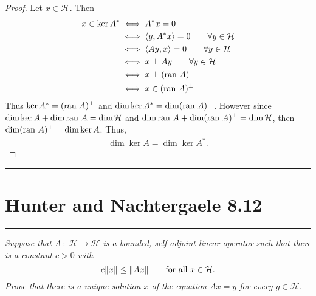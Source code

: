\documentclass{article} %
\theoremstyle{plain}
\newcommand{\VEC}[2]{\left\langle #1, #2 \right\rangle}
\newcommand{\ran}{\text{\rm ran }}
\newcommand{\problem}[1]{
\vspace{.375cm}
\begin{minipage}{\textwidth}
    \begin{center}
        \noindent\rule{5cm}{1pt}
    \end{center}
    \section{\bf #1}
    \begin{center}
        \noindent\rule{5cm}{1pt}
    \end{center}
    \vspace{0.25cm}
\end{minipage}
}
\numberwithin{equation}{section} %
\numberwithin{figure}{section} %
\numberwithin{table}{section} %
\begin{document}
\begin{proof}
    Let $x \in \mathcal{H}$.  Then
    \begin{align*}
        x \in \ker A^* &\iff A^*x = 0 \\
        &\iff \VEC{y}{A^*x} = 0 \qquad \forall y \in \mathcal{H} \\
        &\iff \VEC{Ay}{x} = 0 \qquad \forall y \in \mathcal{H} \\
        &\iff x \perp Ay \qquad \forall y \in \mathcal{H} \\
        &\iff x \perp (\ran A) \\
        &\iff x \in (\ran A)^\perp
    \end{align*}
    Thus $\ker A^* = (\ran A)^\perp$ and $\dim \ker A^* = \dim (\ran A)^\perp$.  However since $\dim \ker A + \dim \ran A = \dim \mathcal{H}$ and $\dim \ran A + \dim (\ran A)^\perp = \dim \mathcal{H}$, then $\dim (\ran A)^\perp = \dim \ker A$.  Thus,
    \begin{align*}
        \dim \ker A = \dim \ker A^*.
    \end{align*}
\end{proof}










\problem{Hunter and Nachtergaele 8.12}
\emph{Suppose that $A\ :\ \mathcal{H} \rightarrow \mathcal{H}$ is a bounded, self-adjoint linear operator such that there is a constant $c > 0$ with $$c\norm{x} \leq \norm{Ax} \qquad \text{for all } x \in \mathcal{H}.$$  Prove that there is a unique solution $x$ of the equation $Ax = y$ for every $y \in \mathcal{H}$.}
\end{document}
